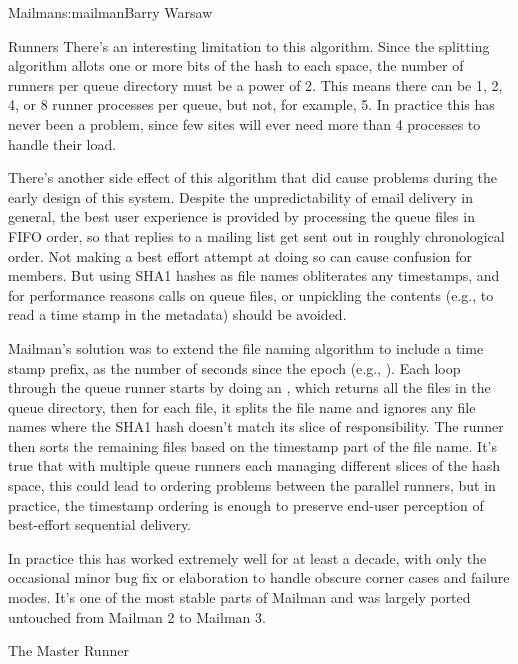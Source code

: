 \begin{aosachapter}{Mailman}{s:mailman}{Barry Warsaw}
\begin{aosasect1}{Runners}
There's an interesting limitation to this algorithm.  Since the
splitting algorithm allots one or more bits of the hash to each space,
the number of runners per queue directory must be a power of 2.  This
means there can be 1, 2, 4, or 8 runner processes per queue, but not,
for example, 5.  In practice this has never been a problem, since few
sites will ever need more than 4 processes to handle their load.

There's another side effect of this algorithm that did cause problems
during the early design of this system.  Despite the unpredictability
of email delivery in general, the best user experience is provided by
processing the queue files in FIFO order, so that replies to a mailing
list get sent out in roughly chronological order.  Not making a best
effort attempt at doing so can cause confusion for members.  But using
SHA1 hashes as file names obliterates any timestamps, and for
performance reasons  calls on queue files, or unpickling
the contents (e.g., to read a time stamp in the metadata) should be
avoided.

Mailman's solution was to extend the file naming algorithm to include
a time stamp prefix, as the number of seconds since the epoch (e.g.,
).  Each loop through the queue
runner starts by doing an , which returns all the
files in the queue directory, then for each file, it splits the file
name and ignores any file names where the SHA1 hash doesn't match its
slice of responsibility.  The runner then sorts the remaining files
based on the timestamp part of the file name.  It's true that with
multiple queue runners each managing different slices of the hash
space, this could lead to ordering problems between the parallel
runners, but in practice, the timestamp ordering is enough to preserve
end-user perception of best-effort sequential delivery.

In practice this has worked extremely well for at least a decade, with
only the occasional minor bug fix or elaboration to handle obscure
corner cases and failure modes.  It's one of the most stable parts of
Mailman and was largely ported untouched from Mailman 2 to Mailman 3.

\end{aosasect1}

\begin{aosasect1}{The Master Runner}


\end{aosasect1}
\end{aosachapter}
